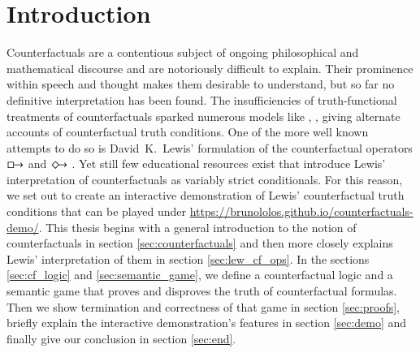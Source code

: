\documentclass[a4paper,american,10pt]{paper}
\theoremstyle{definition}\newtheorem{lemma}[thm]{Lemma}
\theoremstyle{definition}\newtheorem{proposition}[thm]{Proposition}
\theoremstyle{definition}\newtheorem{corollary}[thm]{Corollary}
\theoremstyle{definition}\newtheorem{definition}{Definition}
\begin{document}
\section{Introduction}
Counterfactuals are a contentious subject of ongoing philosophical and mathematical discourse and are notoriously difficult to explain. Their prominence within speech and thought makes them desirable to understand, but so far no definitive interpretation has been found. The insufficiencies of truth-functional treatments of counterfactuals sparked numerous models like \cite{kripke_modal_logic_1963}, \cite{stalnaker_theory_1968}, \cite{lewis_counterfactuals_1973} giving alternate accounts of counterfactual truth conditions. One of the more well known attempts to do so is David~K.~Lewis' formulation of the counterfactual operators $\boxright$ and $\Diamondright$ \cite{lewis_counterfactuals_1973}. Yet still few educational resources exist that introduce Lewis' interpretation of counterfactuals as variably strict conditionals. For this reason, we set out to create an interactive demonstration of Lewis' counterfactual truth conditions that can be played under \url{https://brunololos.github.io/counterfactuals-demo/}. This thesis begins with a general introduction to the notion of counterfactuals in section \ref{sec:counterfactuals} and then more closely explains Lewis' interpretation of them in section \ref{sec:lew_cf_ops}. In the sections \ref{sec:cf_logic} and \ref{sec:semantic_game}, we define a counterfactual logic and a semantic game that proves and disproves the truth of counterfactual formulas. Then we show termination and correctness of that game in section \ref{sec:proofs}, briefly explain the interactive demonstration's features in section \ref{sec:demo} and finally give our conclusion in section \ref{sec:end}.
\end{document}
